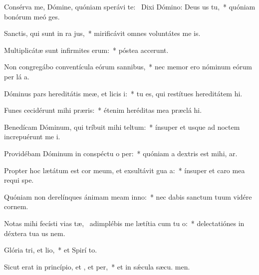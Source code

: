 \item Consérva me, Dómine, quóniam sperávi  te:~\pscross{} Dixi Dómino: Deus us  tu,~* quóniam bonórum meó  ges.
\item Sanctis, qui sunt in ra jus,~* mirificávit omnes voluntátes me  is.
\item Multiplicátæ sunt infirmites erum:~* póstea accerunt.
\item Non congregábo conventícula eórum  sannibus,~* nec memor ero nóminum eórum per lá a.
\item Dóminus pars hereditátis meæ, et licis i:~* tu es, qui restítues hereditátem  hi.
\item Funes cecidérunt mihi  præris:~* étenim heréditas mea præclá  hi.
\item Benedícam Dóminum, qui tríbuit mihi teltum:~* ínsuper et usque ad noctem increpuérunt me  i.
\item Providébam Dóminum in conspéctu o per:~* quóniam a dextris est mihi,  ar.
\item Propter hoc lætátum est cor meum, et exsultávit gua a:~* ínsuper et caro mea requi  spe.
\item Quóniam non derelínques ánimam meam  inno:~* nec dabis sanctum tuum vidére cornem.
\item Notas mihi fecísti vias tæ,~\pscross{} adimplébis me lætítia cum tu o:~* delectatiónes in déxtera tua us  nem.
\item Glória tri, et lio,~* et Spirí to.
\item Sicut erat in princípio, et , et per,~* et in sǽcula sæcu. men.
